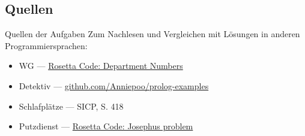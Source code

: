 \documentclass{beamer}
\begin{document}
\subsection{Quellen}

\begin{frame}{Quellen der Aufgaben}
	Zum Nachlesen und Vergleichen mit Lösungen in anderen Programmiersprachen:
	\begin{itemize}
		\item WG --- \href{https://rosettacode.org/wiki/Department_Numbers}{Rosetta Code: Department Numbers}
		\item Detektiv --- \href{https://github.com/Anniepoo/prolog-examples/blob/master/newdetective.pl}{github.com/Anniepoo/prolog-examples}
		\item Schlafplätze --- SICP, S. 418
		\item Putzdienst --- \href{https://rosettacode.org/wiki/Josephus_problem}{Rosetta Code: Josephus problem}
	\end{itemize}
\end{frame}

\end{document}
